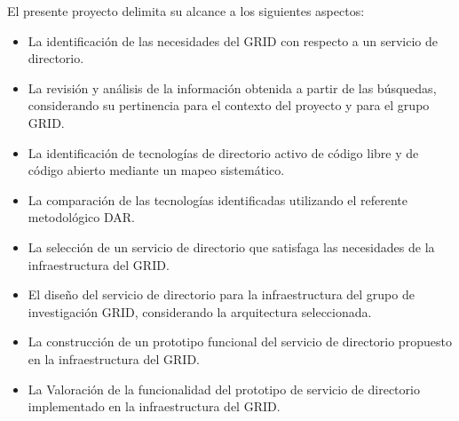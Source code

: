 \vspace*{0.7cm}

El presente proyecto delimita su alcance a los siguientes aspectos:

\begin{itemize}
  \item La identificación de las necesidades del \ac{GRID} con respecto a un servicio de directorio.
  \item La revisión y análisis de la información obtenida a partir de las búsquedas, considerando su pertinencia para el contexto del proyecto y para el grupo \ac{GRID}.
  \item La identificación de tecnologías de directorio activo de código libre y de código abierto mediante un mapeo sistemático.
  \item La comparación de las tecnologías identificadas utilizando el referente metodológico \ac{DAR}.
  \item La selección de un servicio de directorio que satisfaga las necesidades de la infraestructura del \ac{GRID}.
  \item El diseño del servicio de directorio para la infraestructura del grupo de investigación \ac{GRID}, considerando la arquitectura seleccionada.
  \item La construcción de un prototipo funcional del servicio de directorio propuesto en la infraestructura del \ac{GRID}.
  \item La Valoración de la funcionalidad del prototipo de servicio de directorio implementado en la infraestructura del \ac{GRID}.
\end{itemize}
